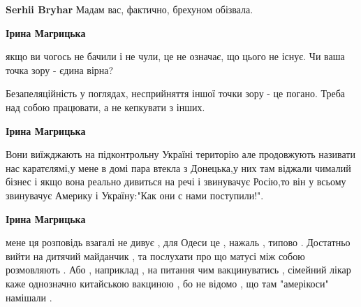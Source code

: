 \begin{itemize}
\begin{itemize}
 
\textbf{Serhii Bryhar} Мадам вас, фактично, брехуном обізвала.

 
\textbf{Ірина Магрицька} 

якщо ви чогось не бачили і не чули, це не означає, що цього не існує. Чи ваша
точка зору - єдина вірна?

Безапеляційність у поглядах, несприйняття іншої точки зору - це погано. Треба
над собою працювати, а не кепкувати з інших.

 
\textbf{Ірина Магрицька} 

Вони виїжджають на підконтрольну Україні територію але продовжують називати нас
каратєлямі,у мене в домі пара втекла з Донецька,у них там віджали чималий
бізнес і якщо вона реально дивиться на речі і звинувачує Росію,то він у всьому
звинувачує Америку і Україну:"Как они с нами поступили!".


 
\textbf{Ірина Магрицька} 

мене ця розповідь взагалі не дивує , для Одеси це , нажаль , типово . Достатньо
вийти на дитячий майданчик , та послухати про що матусі між собою розмовляють .
Або , наприклад , на питання чим вакцинуватись , сімейний лікар каже однозначно
китайською вакциною , бо не відомо , що там "амерікоси" намішали .

 

\end{itemize}
\end{itemize}
